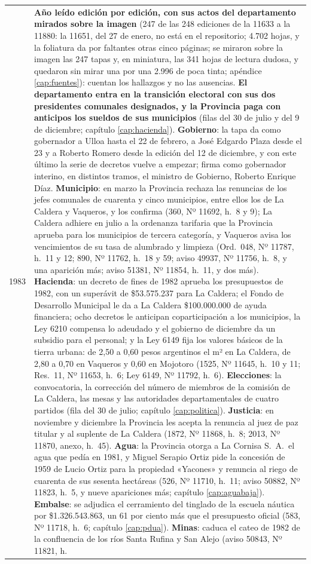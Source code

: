 \begin{longtable}{@{}p{2.7cm}p{10.3cm}@{}}
1983 & \textbf{Año leído edición por edición, con sus actos del departamento mirados sobre la imagen} (247 de las 248 ediciones de la 11633 a la 11880: la 11651, del 27 de enero, no está en el repositorio; 4.702 hojas, y la foliatura da por faltantes otras cinco páginas; se miraron sobre la imagen las 247 tapas y, en miniatura, las 341 hojas de lectura dudosa, y quedaron sin mirar una por una 2.996 de poca tinta; apéndice \ref{cap:fuentes}): cuentan los hallazgos y no las ausencias. \textbf{El departamento entra en la transición electoral con sus dos presidentes comunales designados, y la Provincia paga con anticipos los sueldos de sus municipios} (filas del 30 de julio y del 9 de diciembre; capítulo \ref{cap:hacienda}). \textbf{Gobierno}: la tapa da como gobernador a Ulloa hasta el 22 de febrero, a José Edgardo Plaza desde el 23 y a Roberto Romero desde la edición del 12 de diciembre, y con este último la serie de decretos vuelve a empezar; firma como gobernador interino, en distintos tramos, el ministro de Gobierno, Roberto Enrique Díaz. \textbf{Municipio}: en marzo la Provincia rechaza las renuncias de los jefes comunales de cuarenta y cinco municipios, entre ellos los de La Caldera y Vaqueros, y los confirma (360, Nº 11692, h.\ 8 y 9); La Caldera adhiere en julio a la ordenanza tarifaria que la Provincia aprueba para los municipios de tercera categoría, y Vaqueros avisa los vencimientos de su tasa de alumbrado y limpieza (Ord.\ 048, Nº 11787, h.\ 11 y 12; 890, Nº 11762, h.\ 18 y 59; aviso 49937, Nº 11756, h.\ 8, y una aparición más; aviso 51381, Nº 11854, h.\ 11, y dos más). \textbf{Hacienda}: un decreto de fines de 1982 aprueba los presupuestos de 1982, con un superávit de \$53.575.237 para La Caldera; el Fondo de Desarrollo Municipal le da a La Caldera \$100.000.000 de ayuda financiera; ocho decretos le anticipan coparticipación a los municipios, la Ley 6210 compensa lo adeudado y el gobierno de diciembre da un subsidio para el personal; y la Ley 6149 fija los valores básicos de la tierra urbana: de 2,50 a 0,60 pesos argentinos el m² en La Caldera, de 2,80 a 0,70 en Vaqueros y 0,60 en Mojotoro (1525, Nº 11645, h.\ 10 y 11; Res.\ 11, Nº 11653, h.\ 6; Ley 6149, Nº 11792, h.\ 6). \textbf{Elecciones}: la convocatoria, la corrección del número de miembros de la comisión de La Caldera, las mesas y las autoridades departamentales de cuatro partidos (fila del 30 de julio; capítulo \ref{cap:politica}). \textbf{Justicia}: en noviembre y diciembre la Provincia les acepta la renuncia al juez de paz titular y al suplente de La Caldera (1872, Nº 11868, h.\ 8; 2013, Nº 11870, anexo, h.\ 45). \textbf{Agua}: la Provincia otorga a La Cornisa S.\ A.\ el agua que pedía en 1981, y Miguel Serapio Ortiz pide la concesión de 1959 de Lucio Ortiz para la propiedad «Yacones» y renuncia al riego de cuarenta de sus sesenta hectáreas (526, Nº 11710, h.\ 11; aviso 50882, Nº 11823, h.\ 5, y nueve apariciones más; capítulo \ref{cap:aguabaja}). \textbf{Embalse}: se adjudica el cerramiento del tinglado de la escuela náutica por \$1.326.543.863, un 61 por ciento más que el presupuesto oficial (583, Nº 11718, h.\ 6; capítulo \ref{cap:pdua}). \textbf{Minas}: caduca el cateo de 1982 de la confluencia de los ríos Santa Rufina y San Alejo (aviso 50843, Nº 11821, h.\ 
\end{longtable}
